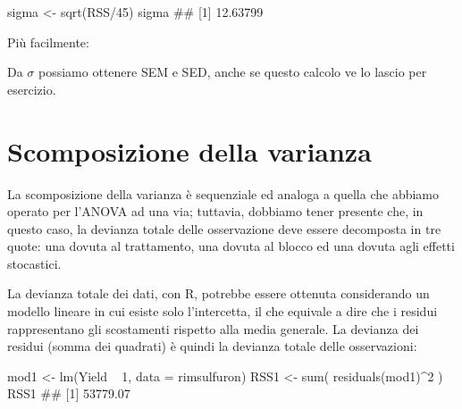 \documentclass[a4paper,12pt,oneside]{book}
\newenvironment{Shaded}{}{}
\newcommand{\KeywordTok}[1]{#1}
\newcommand{\DataTypeTok}[1]{#1}
\newcommand{\DecValTok}[1]{#1}
\newcommand{\StringTok}[1]{#1}
\newcommand{\CommentTok}[1]{#1}
\newcommand{\OperatorTok}[1]{#1}
\newcommand{\NormalTok}[1]{#1}
\begin{document}
\begin{Shaded}
\begin{Highlighting}[]
\NormalTok{sigma <-}\StringTok{ }\KeywordTok{sqrt}\NormalTok{(RSS}\OperatorTok{/}\DecValTok{45}\NormalTok{)}
\NormalTok{sigma}
\CommentTok{## [1] 12.63799}
\end{Highlighting}
\end{Shaded}

Più facilmente:

\begin{Shaded}
\end{Shaded}

Da \(\sigma\) possiamo ottenere SEM e SED, anche se questo calcolo ve lo lascio per esercizio.

\hypertarget{scomposizione-della-varianza-1}{%
\section{Scomposizione della varianza}\label{scomposizione-della-varianza-1}}

La scomposizione della varianza è sequenziale ed analoga a quella che abbiamo operato per l'ANOVA ad una via; tuttavia, dobbiamo tener presente che, in questo caso, la devianza totale delle osservazione deve essere decomposta in tre quote: una dovuta al trattamento, una dovuta al blocco ed una dovuta agli effetti stocastici.

La devianza totale dei dati, con R, potrebbe essere ottenuta considerando un modello lineare in cui esiste solo l'intercetta, il che equivale a dire che i residui rappresentano gli scostamenti rispetto alla media generale. La devianza dei residui (somma dei quadrati) è quindi la devianza totale delle osservazioni:

\begin{Shaded}
\begin{Highlighting}[]
\NormalTok{mod1 <-}\StringTok{ }\KeywordTok{lm}\NormalTok{(Yield }\OperatorTok{~}\StringTok{ }\DecValTok{1}\NormalTok{, }\DataTypeTok{data =}\NormalTok{ rimsulfuron)}
\NormalTok{RSS1 <-}\StringTok{ }\KeywordTok{sum}\NormalTok{( }\KeywordTok{residuals}\NormalTok{(mod1)}\OperatorTok{^}\DecValTok{2}\NormalTok{ )}
\NormalTok{RSS1}
\CommentTok{## [1] 53779.07}
\end{Highlighting}
\end{Shaded}
\end{document}
